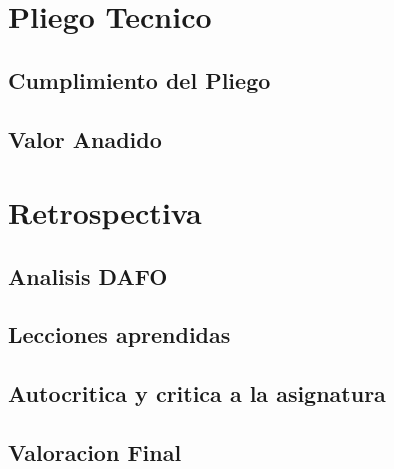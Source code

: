 \documentclass{beamer}
\begin{document}
\section{Pliego Tecnico}

\subsection{Cumplimiento del Pliego}

\subsection{Valor Anadido}

\section{Retrospectiva}

\subsection{Analisis DAFO}

\subsection{Lecciones aprendidas}

\subsection{Autocritica y critica a la asignatura}

\subsection{Valoracion Final}

\end{document}
